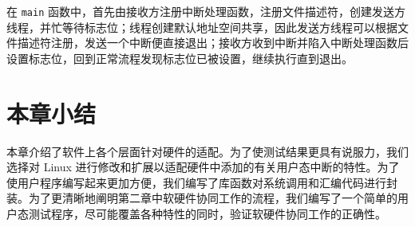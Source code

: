 在 \texttt{main} 函数中，首先由接收方注册中断处理函数，注册文件描述符，创建发送方线程，并忙等待标志位；线程创建默认地址空间共享，因此发送方线程可以根据文件描述符注册，发送一个中断便直接退出；接收方收到中断并陷入中断处理函数后设置标志位，回到正常流程发现标志位已被设置，继续执行直到退出。

\section{本章小结}

本章介绍了软件上各个层面针对硬件的适配。为了使测试结果更具有说服力，我们选择对 Linux 进行修改和扩展以适配硬件中添加的有关用户态中断的特性。为了使用户程序编写起来更加方便，我们编写了库函数对系统调用和汇编代码进行封装。为了更清晰地阐明第二章中软硬件协同工作的流程，我们编写了一个简单的用户态测试程序，尽可能覆盖各种特性的同时，验证软硬件协同工作的正确性。
